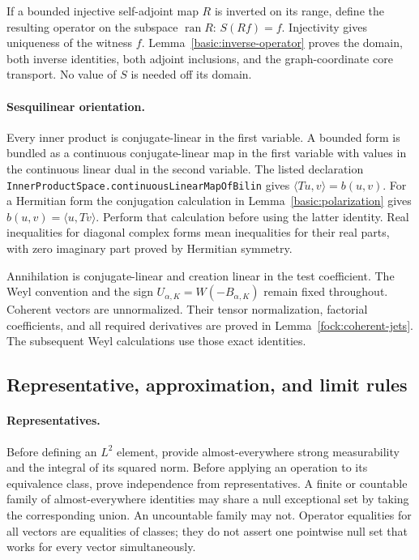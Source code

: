 \documentclass[11pt,a4paper]{article}
\theoremstyle{definition}
\theoremstyle{remark}
\begin{document}
If a bounded injective self-adjoint map $R$ is inverted on its range,
define the resulting operator on the subspace $\operatorname{ran}R$:
$S(Rf)=f$. Injectivity gives uniqueness of the witness $f$.
Lemma~\ref{basic:inverse-operator} proves the domain, both inverse
identities, both adjoint inclusions, and the graph-coordinate core
transport. No value of $S$ is needed off its domain.

\paragraph{Sesquilinear orientation.}
Every inner product is conjugate-linear in the first variable.
A bounded form is bundled as a continuous conjugate-linear map
in the first variable with values in the continuous linear dual
in the second variable. The listed declaration
\nolinkurl{InnerProductSpace.continuousLinearMapOfBilin} gives
$\langle Tu,v\rangle=b(u,v)$. For a Hermitian form the conjugation
calculation in Lemma~\ref{basic:polarization} gives
$b(u,v)=\langle u,Tv\rangle$. Perform that calculation before
using the latter identity. Real inequalities for diagonal complex
forms mean inequalities for their real parts, with zero imaginary
part proved by Hermitian symmetry.

Annihilation is conjugate-linear and creation linear in the test
coefficient. The Weyl convention and the sign
$U_{\alpha,K}=W(-B_{\alpha,K})$ remain fixed throughout.
Coherent vectors are unnormalized. Their tensor normalization,
factorial coefficients, and all required derivatives are proved in
Lemma~\ref{fock:coherent-jets}. The subsequent Weyl calculations
use those exact identities.

\subsection{Representative, approximation, and limit rules}

\paragraph{Representatives.}
Before defining an $L^2$ element, provide almost-everywhere strong
measurability and the integral of its squared norm. Before applying
an operation to its equivalence class, prove independence from
representatives. A finite or countable family of almost-everywhere
identities may share a null exceptional set by taking the corresponding
union. An uncountable family may not. Operator equalities for all
vectors are equalities of classes; they do not assert one pointwise
null set that works for every vector simultaneously.
\end{document}
